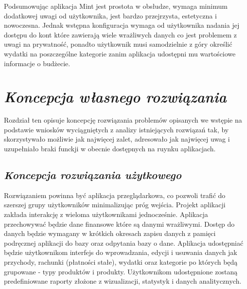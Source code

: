 \documentclass[a4paper,10pt, twoside]{report}
\newcommand{\customstylechapter}[1]{\large{\textit{#1}}}
\newcommand{\customstylesection}[1]{\textbf{\textit{#1}}}
\begin{document}
\begin{large}
{Podsumowując aplikacja Mint jest prostota w obsłudze, wymaga minimum dodatkowej
 uwagi od użytkownika, jest bardzo przejrzysta, estetyczna i nowoczesna. Jednak 
wstępna konfiguracja wymaga od użytkownika nadania jej dostępu do kont które 
zawierają wiele wrażliwych danych co jest problemem z uwagi na prywatność, 
ponadto użytkownik musi samodzielnie z góry określić wydatki na poszczególne 
kategorie zanim aplikacja udostępni mu wartościowe informacje o budżecie.}

\chapter{\customstylechapter{Koncepcja własnego rozwiązania}}
{Rozdział ten opisuje koncepcję rozwiązania problemów opisanych we wstępie na 
podstawie wniosków wyciągniętych z analizy istniejących rozwiązań tak, by 
skorzystywało możliwie jak najwięcej zalet, adresowało jak najwięcej uwag i 
uzupełniało braki funckji w obecnie dostępnych na ruynku aplikacjach.}


\section{\customstylesection{Koncepcja rozwiązania użytkowego}}
{Rozwiązaniem powinna być aplikacja przeglądarkowa, co pozwoli trafić do 
szerszej grupy użytkowników minimalizując próg wejścia. Projekt aplikacji 
zakłada interakcję z wieloma użytkownikami jednocześnie. Aplikacja przechowywać 
będzie dane finansowe które są danymi wrażliwymi. Dostęp do danych będzie 
wymagany w krótkich okresach zapisu danych z pamięci podręcznej aplikacji do 
bazy oraz odpytania bazy o dane. Aplikacja udostępniać będzie użytkownikom 
interfejs do wprowadzania, edycji i usuwania danych jak przychody, rachunki 
(płatności stałe), wydatki oraz kategorie po których będą grupowane - typy 
produktów i produkty. Użytkownikom udostępnione zostaną predefiniowane raporty 
złożone z wizualizacji, statystyk i danych analitycznych.}


\end{large}
\end{document}
